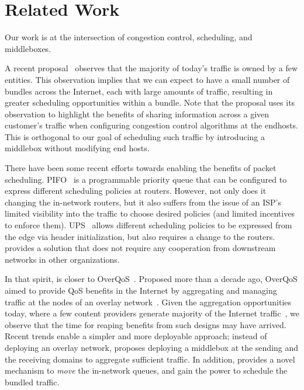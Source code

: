 \section{Related Work}
\label{s:related}

Our work is at the intersection of congestion control, scheduling, and middleboxes. 

 A recent proposal~\cite{fivecomps} observes that the majority of today's traffic is owned by a few entities.
This observation implies that we can expect to have a small number of bundles across the Internet, each with large amounts of traffic, resulting in greater scheduling opportunities within a bundle. Note that the proposal uses its observation to highlight the benefits of sharing information across a given customer's traffic when configuring congestion control algorithms at the endhosts. This is orthogonal to our goal of scheduling such traffic by introducing a middlebox without modifying end hosts.


 There have been some recent efforts towards enabling the benefits of packet scheduling. PIFO~\cite{pifo} is a programmable priority queue that can be configured to express different scheduling policies at routers. However, not only does it changing the in-network routers, but it also suffers from the issue of an ISP's limited visibility into the traffic to choose desired policies (and limited incentives to enforce them). UPS~\cite{ups} allows different scheduling policies to be expressed from the edge via header initialization, but also requires a change to the routers.
\name provides a solution that does not require any cooperation from downstream networks in other organizations.

In that spirit, \name is closer to OverQoS~\cite{overqos}. Proposed more than a decade ago, OverQoS aimed to provide QoS benefits in the Internet by aggregating and managing traffic at the nodes of an overlay network~\cite{ron}. Given the aggregation opportunities today, where a few content providers generate majority of the Internet traffic~\cite{fivecomps}, we observe that the time for reaping benefits from such designs may have arrived. Recent trends enable a simpler and more deployable approach; instead of deploying an overlay network, \name{} proposes deploying a middlebox at the sending and the receiving domains to aggregate sufficient traffic. In addition, \name provides a novel mechanism to \emph{move} the in-network queues, and gain the power to schedule the bundled traffic. 


